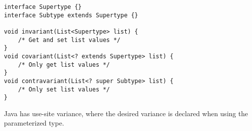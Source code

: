\begin{algorithm}

\begin{verbatim}
interface Supertype {}
interface Subtype extends Supertype {}

void invariant(List<Supertype> list) {
    /* Get and set list values */
}
void covariant(List<? extends Supertype> list) {
    /* Only get list values */
}
void contravariant(List<? super Subtype> list) {
    /* Only set list values */
}
\end{verbatim}

\caption{Java has use-site variance, where the desired variance is declared when using the parameterized type. \label{use-site-variance}}
\end{algorithm}